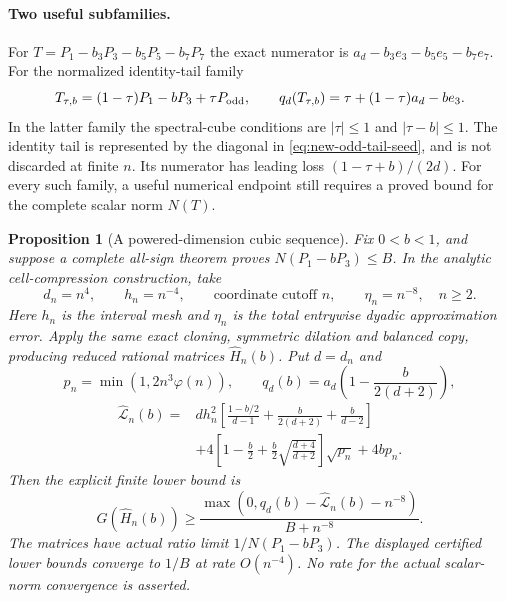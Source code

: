 \documentclass[11pt]{article}
\newtheorem{proposition}[theorem]{Proposition}
\begin{document}
\paragraph{Two useful subfamilies.}
For $T=P_1-b_3P_3-b_5P_5-b_7P_7$ the exact numerator is
$a_d-b_3e_3-b_5e_5-b_7e_7$.  For the normalized identity-tail family
\[
 T_{\tau,b}=(1-\tau)P_1-bP_3+\tau P_{\rm odd},
 \qquad q_d(T_{\tau,b})=\tau+(1-\tau)a_d-be_3.
\]
In the latter family the spectral-cube conditions are
$|\tau|\leq1$ and $|\tau-b|\leq1$.  The identity tail is represented
by the diagonal in \eqref{eq:new-odd-tail-seed}, and is not discarded
at finite $n$.  Its numerator has leading loss
$(1-\tau+b)/(2d)$.  For every such family, a useful numerical endpoint
still requires a proved bound for the complete scalar norm $N(T)$.

\begin{proposition}[A powered-dimension cubic sequence]
\label{prop:new-powered-cubic-sequence}
Fix $0<b<1$, and suppose a complete all-sign theorem proves
$N(P_1-bP_3)\leq B$.  In the analytic cell-compression construction,
take
\[
 d_n=n^4,\qquad h_n=n^{-4},\qquad \text{coordinate cutoff }n,
                   \qquad \eta_n=n^{-8},\quad n\geq2.
\]
Here $h_n$ is the interval mesh and $\eta_n$ is the total entrywise
dyadic approximation error.  Apply the same exact cloning, symmetric
dilation and balanced copy, producing reduced rational matrices
$\widehat H_n(b)$.  Put $d=d_n$ and
\[
 p_n=\min(1,2n^3\varphi(n)),\qquad
 q_d(b)=a_d\left(1-\frac b{2(d+2)}\right),
\]
\begin{align*}
 \widehat{\mathcal L}_n(b)={}&dh_n^2
 \left[\frac{1-b/2}{d-1}+\frac b{2(d+2)}+\frac b{d-2}\right]\\
 &+4\left[1-\frac b2+\frac b2\sqrt{\frac{d+4}{d+2}}\right]
                         \sqrt{p_n}+4bp_n.
\end{align*}
Then the explicit finite lower bound is
\[
 G(\widehat H_n(b))\geq
 \frac{\max(0,q_d(b)-\widehat{\mathcal L}_n(b)-n^{-8})}
                           {B+n^{-8}}.
\]
The matrices have actual ratio limit $1/N(P_1-bP_3)$.
The displayed certified lower bounds converge to $1/B$ at rate
$O(n^{-4})$.  No rate for the actual scalar-norm convergence is
asserted.
\end{proposition}
\end{document}
